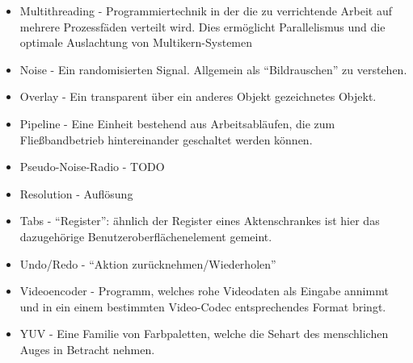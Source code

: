\begin{itemize}
    \item Multithreading - Programmiertechnik in der die zu verrichtende Arbeit auf mehrere Prozessfäden verteilt wird. Dies ermöglicht Parallelismus und die optimale Auslachtung von Multikern-Systemen
    \item Noise - Ein randomisierten Signal. Allgemein als ``Bildrauschen'' zu verstehen.
    \item Overlay - Ein transparent über ein anderes Objekt gezeichnetes Objekt.
    \item Pipeline - Eine Einheit bestehend aus Arbeitsabläufen, die zum Fließbandbetrieb hintereinander geschaltet werden können.
    \item Pseudo-Noise-Radio - TODO %
    \item Resolution - Auflösung
    \item Tabs - ``Register'': ähnlich der Register eines Aktenschrankes ist hier das dazugehörige Benutzeroberflächenelement gemeint.
    \item Undo/Redo - ``Aktion zurücknehmen/Wiederholen''
    \item Videoencoder - Programm, welches rohe Videodaten als Eingabe annimmt und in ein einem bestimmten Video-Codec entsprechendes Format bringt.
    \item YUV - Eine Familie von Farbpaletten, welche die Sehart des menschlichen Auges in Betracht nehmen.
\end{itemize}
